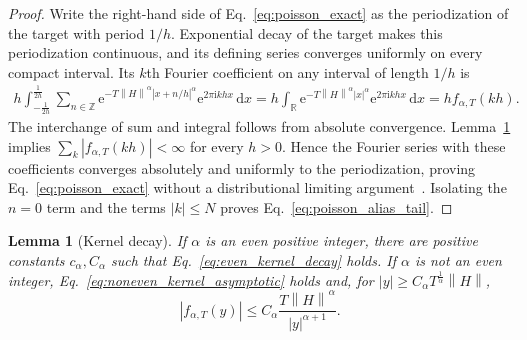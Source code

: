 \documentclass[aps,pra,reprint,floatfix,unsortedaddress,superscriptaddress]{revtex4-2}
\newtheorem{lemma}[theorem]{Lemma}
\newcommand{\norm}[1]{\left\lVert#1\right\rVert}
\newcommand{\abs}[1]{\left\lvert#1\right\rvert}
\begin{document}
\begin{proof}
Write the right-hand side of Eq.~\eqref{eq:poisson_exact} as the
periodization of the target with period $1/h$.  Exponential decay of
the target makes this periodization continuous, and its defining
series converges uniformly on every compact interval.  Its $k$th
Fourier coefficient on any interval of length $1/h$ is
\begin{align*}
h\int_{-\frac{1}{2h}}^{\frac{1}{2h}}
\sum_{n\in\mathbb Z}
\mathrm e^{-T\norm{H}^{\alpha}\abs{x+n/h}^{\alpha}}
\mathrm e^{2\pi\mathrm i khx}\,\mathrm dx
=
h\int_{\mathbb R}
\mathrm e^{-T\norm{H}^{\alpha}\abs{x}^{\alpha}}
\mathrm e^{2\pi\mathrm i khx}\,\mathrm dx
=h f_{\alpha,T}(kh).
\end{align*}
The interchange of sum and integral follows from absolute
convergence.  Lemma~\ref{lem:kernel_decay} implies
$\sum_k\abs{f_{\alpha,T}(kh)}<\infty$ for every $h>0$.  Hence the
Fourier series with these coefficients converges absolutely and
uniformly to the periodization, proving
Eq.~\eqref{eq:poisson_exact} without a distributional limiting
argument~\cite{katznelson2004introduction}.  Isolating the $n=0$ term
and the terms $\abs{k}\leq N$ proves
Eq.~\eqref{eq:poisson_alias_tail}.
\end{proof}

\begin{lemma}[Kernel decay]
\label{lem:kernel_decay}
If $\alpha$ is an even positive integer, there are positive constants
$c_\alpha,C_\alpha$ such that
Eq.~\eqref{eq:even_kernel_decay} holds.  If $\alpha$ is not an even
integer, Eq.~\eqref{eq:noneven_kernel_asymptotic} holds and, for
$\abs{y}\geq C_\alpha T^{\frac{1}{\alpha}}\norm{H}$,
\begin{equation}
    \abs{f_{\alpha,T}(y)}
    \leq
    C_\alpha
    \frac{T\norm{H}^{\alpha}}{\abs{y}^{\alpha+1}}.
    \label{eq:noneven_kernel_bound}
\end{equation}
\end{lemma}
\end{document}
